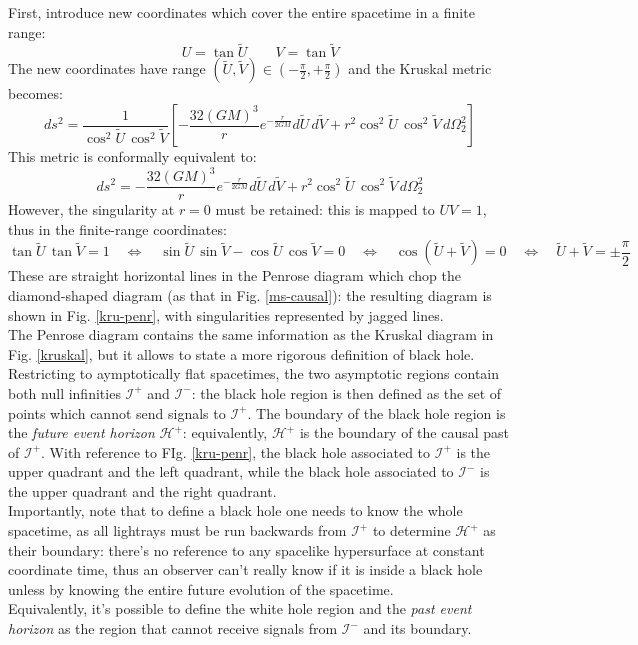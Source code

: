 First, introduce new coordinates which cover the entire spacetime in a finite range:
\begin{equation*}
  U = \tan \tilde{U}
  \qquad
  V = \tan \tilde{V}
\end{equation*}
The new coordinates have range $ (\tilde{U},\tilde{V}) \in (-\frac{\pi}{2}, + \frac{\pi}{2}) $ and the Kruskal metric becomes:
\begin{equation*}
  ds^2 = \frac{1}{\cos^2 \tilde{U} \, \cos^2 \tilde{V}} \left[ - \frac{32 (GM)^3}{r} e^{-\frac{r}{2GM}} d\tilde{U}\,d\tilde{V} + r^2 \cos^2 \tilde{U} \, \cos^2 \tilde{V} \, d\Omega_2^2 \right]
\end{equation*}
This metric is conformally equivalent to:
\begin{equation*}
  ds^2 = - \frac{32 (GM)^3}{r} e^{-\frac{r}{2GM}} d\tilde{U}\,d\tilde{V} + r^2 \cos^2 \tilde{U} \, \cos^2 \tilde{V} \, d\Omega_2^2
\end{equation*}
However, the singularity at $ r = 0 $ must be retained: this is mapped to $ UV = 1 $, thus in the finite-range coordinates:
\begin{equation*}
  \tan \tilde{U} \, \tan \tilde{V} = 1
  \quad \Leftrightarrow \quad
  \sin \tilde{U} \, \sin \tilde{V} - \cos \tilde{U} \, \cos \tilde{V} = 0
  \quad \Leftrightarrow \quad
  \cos (\tilde{U} + \tilde{V}) = 0
  \quad \Leftrightarrow \quad
  \tilde{U} + \tilde{V} = \pm \frac{\pi}{2}
\end{equation*}
These are straight horizontal lines in the Penrose diagram which chop the diamond-shaped diagram (as that in Fig. \ref{ms-causal}): the resulting diagram is shown in Fig. \ref{kru-penr}, with singularities represented by jagged lines.\\
The Penrose diagram contains the same information as the Kruskal diagram in Fig. \ref{kruskal}, but it allows to state a more rigorous definition of black hole. Restricting to aymptotically flat spacetimes, the two asymptotic regions contain both null infinities $ \mathcal{I}^+ $ and $ \mathcal{I}^- $: the black hole region is then defined as the set of points which cannot send signals to $ \mathcal{I}^+ $. The boundary of the black hole region is the \textit{future event horizon} $ \mathcal{H}^+ $: equivalently, $ \mathcal{H}^+ $ is the boundary of the causal past of $ \mathcal{I}^+ $. With reference to FIg. \ref{kru-penr}, the black hole associated to $ \mathcal{I}^+ $ is the upper quadrant and the left quadrant, while the black hole associated to $ \mathcal{I}^- $ is the upper quadrant and the right quadrant.\\
Importantly, note that to define a black hole one needs to know the whole spacetime, as all lightrays must be run backwards from $ \mathcal{I}^+ $ to determine $ \mathcal{H}^+ $ as their boundary: there's no reference to any spacelike hypersurface at constant coordinate time, thus an observer can't really know if it is inside a black hole unless by knowing the entire future evolution of the spacetime.\\
Equivalently, it's possible to define the white hole region and the \textit{past event horizon} as the region that cannot receive signals from $ \mathcal{I}^- $ and its boundary.

